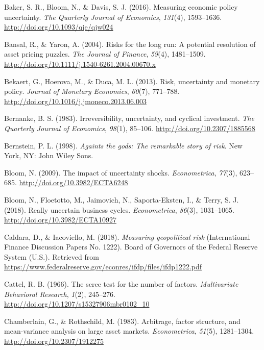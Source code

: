 \documentclass[12pt,twoside]{reedthesis}
\begin{document}
\leavevmode\hypertarget{ref-bakeetal:2016}{}%
Baker, S. R., Bloom, N., \& Davis, S. J. (2016). Measuring economic policy uncertainty. \emph{The Quarterly Journal of Economics}, \emph{131}(4), 1593--1636. \url{http://doi.org/10.1093/qje/qjw024}

\leavevmode\hypertarget{ref-bansyaro:2004}{}%
Bansal, R., \& Yaron, A. (2004). Risks for the long run: A potential resolution of asset pricing puzzles. \emph{The Journal of Finance}, \emph{59}(4), 1481--1509. \url{http://doi.org/10.1111/j.1540-6261.2004.00670.x}

\leavevmode\hypertarget{ref-bekaetal:2013}{}%
Bekaert, G., Hoerova, M., \& Duca, M. L. (2013). Risk, uncertainty and monetary policy. \emph{Journal of Monetary Economics}, \emph{60}(7), 771--788. \url{http://doi.org/10.1016/j.jmoneco.2013.06.003}

\leavevmode\hypertarget{ref-bernanke:1983}{}%
Bernanke, B. S. (1983). Irreversibility, uncertainty, and cyclical investment. \emph{The Quarterly Journal of Economics}, \emph{98}(1), 85--106. \url{http://doi.org/10.2307/1885568}

\leavevmode\hypertarget{ref-bernstein:1998}{}%
Bernstein, P. L. (1998). \emph{Againts the gods: The remarkable story of risk}. New York, NY: John Wiley Sons.

\leavevmode\hypertarget{ref-bloom:2009}{}%
Bloom, N. (2009). The impact of uncertainty shocks. \emph{Econometrica}, \emph{77}(3), 623--685. \url{http://doi.org/10.3982/ECTA6248}

\leavevmode\hypertarget{ref-blooetal:2018}{}%
Bloom, N., Floetotto, M., Jaimovich, N., Saporta-Eksten, I., \& Terry, S. J. (2018). Really uncertain business cycles. \emph{Econometrica}, \emph{86}(3), 1031--1065. \url{http://doi.org/10.3982/ECTA10927}

\leavevmode\hypertarget{ref-caldiaco:2018}{}%
Caldara, D., \& Iacoviello, M. (2018). \emph{Measuring geopolitical risk} (International Finance Discussion Papers No. 1222). Board of Governors of the Federal Reserve System (U.S.). Retrieved from \url{https://www.federalreserve.gov/econres/ifdp/files/ifdp1222.pdf}

\leavevmode\hypertarget{ref-cattel:1966}{}%
Cattel, R. B. (1966). The scree test for the number of factors. \emph{Multivariate Behavioral Research}, \emph{1}(2), 245--276. \url{http://doi.org/10.1207/s15327906mbr0102_10}

\leavevmode\hypertarget{ref-chamroth:1983}{}%
Chamberlain, G., \& Rothschild, M. (1983). Arbitrage, factor structure, and mean-variance analysis on large asset markets. \emph{Econometrica}, \emph{51}(5), 1281--1304. \url{http://doi.org/10.2307/1912275}
\end{document}

